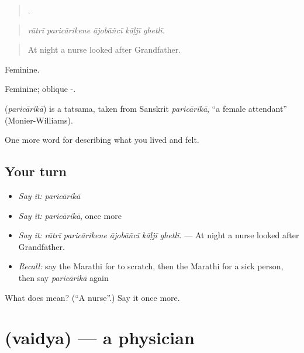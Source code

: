 \begin{quote}
    .
\end{quote}

\begin{quote}
\emph{rātrī paricārikene ājobāñcī kāḷjī ghetlī.}
\end{quote}

\begin{quote}
At night a nurse looked after Grandfather.
\end{quote}

Feminine.

Feminine; oblique -.

\begin{cousinweb}
\textbf{} (\emph{paricārikā}) is a tatsama, taken from Sanskrit \emph{paricārikā}, \textquotedblleft{}a female attendant\textquotedblright{} (Monier-Williams).
\end{cousinweb}

\begin{grammarlens}[title={What you've built}]
One more word for describing what you lived and felt.
\end{grammarlens}

\subsection*{Your turn}
\begin{itemize}
\raggedright
  \item \emph{Say it:} \emph{paricārikā}
  \item \emph{Say it:} \emph{paricārikā}, once more
  \item \emph{Say it:} \emph{rātrī paricārikene ājobāñcī kāḷjī ghetlī.} — At night a nurse looked after Grandfather.
  \item \emph{Recall:} say the Marathi for to scratch, then the Marathi for a sick person, then say \emph{paricārikā} again
\end{itemize}

\begin{tcolorbox}[breakable,colback=teal!4,colframe=teal!35!black,title={Before you move on}]
What does  mean? (\textquotedblleft{}A nurse\textquotedblright{}.) Say it once more.
\end{tcolorbox}
\section[\texorpdfstring{\mr{वैद्य} (vaidya)}{वैद्य (vaidya)}]{ (vaidya) — a physician}


